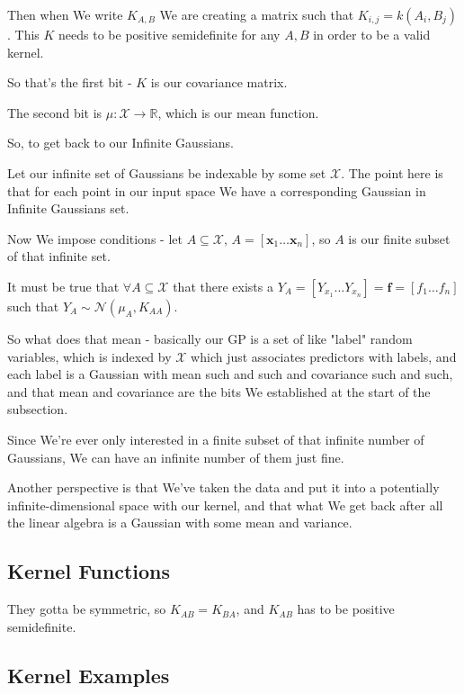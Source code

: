 \documentclass{article}
\begin{document}
		Then when We write $K_{A, B}$ We are creating a matrix such that $K_{i, j} = k(A_i, B_j)$. This $K$ needs to be positive semidefinite for any $A, B$ in order to be a valid kernel.
		
		So that's the first bit - $K$ is our covariance matrix.
		
		The second bit is $\mu:\mathcal{X}\to\mathbb{R}$, which is our mean function. 
		
		So, to get back to our Infinite Gaussians. 
		
		Let our infinite set of Gaussians be indexable by some set $\mathcal{X}$. The point here is that for each point in our input space We have a corresponding Gaussian in Infinite Gaussians set.
		
		Now We impose conditions - let $A\subseteq \mathcal{X}$, $A=[\mathbf{x}_1\ldots\mathbf{x}_n]$, so $A$ is our finite subset of that infinite set.
		
		It must be true that $\forall A\subseteq\mathcal{X}$ that there exists a $Y_A = [Y_{x_1}\ldots Y_{x_n}] = \mathbf{f} = [f_1\ldots f_n]$ such that $Y_A\sim\mathcal{N}(\mu_A, K_{AA})$. 
		
		So what does that mean - basically our GP is a set of like "label" random variables, which is indexed by $\mathcal{X}$ which just associates predictors with labels, and each label is a Gaussian with mean such and such and covariance such and such, and that mean and covariance are the bits We established at the start of the subsection.
		
		Since We're ever only interested in a finite subset of that infinite number of Gaussians, We can have an infinite number of them just fine.
		
		Another perspective is that We've taken the data and put it into a potentially infinite-dimensional space with our kernel, and that what We get back after all the linear algebra is a Gaussian with some mean and variance. 
		
	\subsection{Kernel Functions}
	
		They gotta be symmetric, so $K_{AB} = K_{BA}$, and $K_{AB}$ has to be positive semidefinite.
		
	\subsection{Kernel Examples}
	
\end{document}
